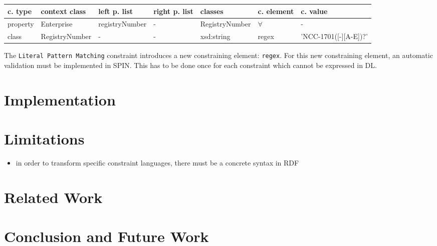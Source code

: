 \documentclass{llncs}
\newcommand{\ms}[1]{\texttt{#1}}
\newenvironment{gcotable}{
  \scriptsize
  \sffamily
  \vspace{0.3cm}
	\begin{center}
  \begin{tabular}{l|l|l|l|l|l|l}
  \hline
  \textbf{c. type} & \textbf{context class} & \textbf{left p. list} & \textbf{right p. list} & \textbf{classes} & \textbf{c. element} & \textbf{c. value} \\
  \hline

}{
  \hline
  \end{tabular}
	\end{center}
}
\begin{document}
\begin{gcotable}
property & Enterprise & registryNumber & - & RegistryNumber & $\forall$ & - \\
class & RegistryNumber & - & - & xsd:string & regex & 'NCC-1701([-][A-E])?' \\
\end{gcotable}

The \ms{Literal Pattern Matching} constraint introduces a new constraining element: \ms{regex}.
For this new constraining element, an automatic validation must be implemented in SPIN.
This has to be done once for each constraint which cannot be expressed in DL.

\section{Implementation}

\section{Limitations}

\begin{itemize}
	\item in order to transform specific constraint languages, there must be a concrete syntax in RDF
\end{itemize}

\section{Related Work}

\section{Conclusion and Future Work}

{}

\setcounter{tocdepth}{1}
\end{document}
